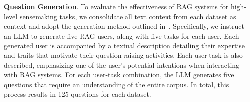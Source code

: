 \textbf{Question Generation}. 
To evaluate the effectiveness of RAG systems for high-level sensemaking tasks, we consolidate all text content from each dataset as context and adopt the generation method outlined in~\cite{edge2024local}. Specifically, we instruct an LLM to generate five RAG users, along with five tasks for each user. Each generated user is accompanied by a textual description detailing their expertise and traits that motivate their question-raising activities. Each user task is also described, emphasizing one of the user's potential intentions when interacting with RAG systems. For each user-task combination, the LLM generates five questions that require an understanding of the entire corpus. In total, this process results in 125 questions for each dataset.


